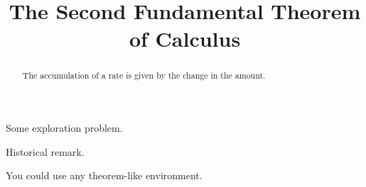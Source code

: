 \documentclass{ximera}
\title[Dig-In:]{The Second Fundamental Theorem of Calculus}
\begin{document}
\begin{abstract}
The accumulation of a rate is given by the change in the amount.
\end{abstract}
\maketitle
\begin{exploration}
  Some exploration problem.
\end{exploration}

\begin{remark}[Historical]
  Historical remark.
\end{remark}


\begin{theorem}[Generalization]
  You could use any theorem-like environment.
\end{theorem}
\end{document}
